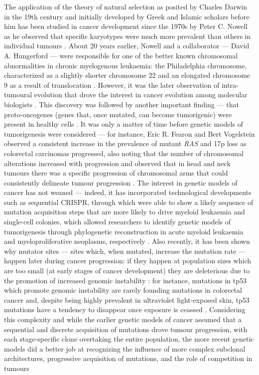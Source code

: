 The application of the theory of natural selection as posited by Charles Darwin in the 19th century \cite{Darwin1859-yw} and initially developed by Greek and Islamic scholars before him \cite{noauthor_1898-xh,Zirkle1941-bw} has been studied in cancer development since the 1970s by Peter C. Nowell as he observed that specific karyotypes were much more prevalent than others in individual tumours \cite{Nowell1976-ob}. About 20 years earlier, Nowell and a collaborator --- David A. Hungerford --- were responsible for one of the better known chromosomal abnormalities in chronic myelogenous leukaemia: the Philadelphia chromosome, characterized as a slightly shorter chromosome 22 and an elongated chromosome 9 as a result of translocation \cite{Nowell2007-ux}. However, it was the later observation of intra-tumoural evolution that drove the interest in cancer evolution among molecular biologists \cite{Cannataro2018-ye}. This discovery was followed by another important finding --- that proto-oncogenes (genes that, once mutated, can become tumorigenic) were present in healthy cells \cite{Stehelin1976-uu,Shih1982-gu}. It was only a matter of time before genetic models of tumorigenesis were considered --- for instance, Eric R. Fearon and Bert Vogelstein observed a consistent increase in the prevalence of mutant \textit{RAS} and 17p loss as colorectal carcinomas progressed, also noting that the number of chromosomal alterations increased with progression \cite{Fearon1990-rk} and  observed that in head and neck tumours there was a specific progression of chromosomal arms that could consistently delineate tumour progression \cite{Califano1996-kj}. The interest in genetic models of cancer has not weaned --- indeed, it has incorporated technological developments such as sequential CRISPR, through which  were able to show a likely sequence of mutation acquisition steps that are more likely to drive myeloid leukaemia \cite{Wang2021-wg} and single-cell colonies, which allowed researchers to identify genetic models of tumorigenesis through phylogenetic reconstruction in acute myeloid leukaemia and myeloproliferative neoplasms, respectively \cite{Morita2020-rq,Williams2020-ji,Van_Egeren2021-tb}. Also recently, it has been shown why mutator sites --- sites which, when mutated, increase the mutation rate --- happen later during cancer progression: if they happen at population sizes which are too small (at early stages of cancer development) they are deleterious due to the promotion of increased genomic instability \cite{Raynes2018-hg}: for instance, mutations in \ac{tp53} which promote genomic instability are rarely founding mutations in colorectal cancer \cite{Kinzler1996-mp} and, despite being highly prevalent in ultraviolet light-exposed skin, \ac{tp53} mutations have a tendency to disappear once exposure is ceassed \cite{Jonason1996-sp}. Considering this complexity and while the earlier genetic models of cancer assumed that a sequential and discrete acquisition of mutations drove tumour progression, with each stage-specific clone overtaking the entire population, the more recent genetic models did a better job at recognizing the influence of more complex subclonal architectures, progressive acquisition of mutations, and the role of competition in tumours 